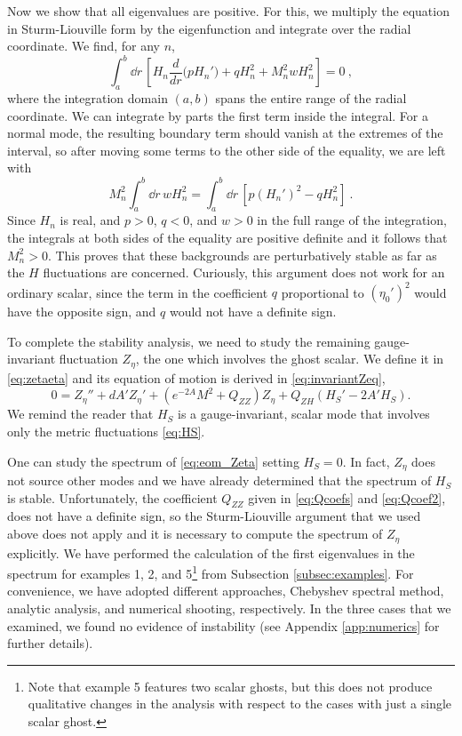 Now we show that all eigenvalues are positive. For this, we multiply the equation in Sturm-Liouville form by the eigenfunction and integrate over the radial coordinate. We find, for any $n$,
\begin{equation}
	\int_a^b  \dd r \, \left[H_n\frac{d}{dr}\Big(p H_n'\Big)+q H_n^2+M_n^2 w H_n^2\right]=0\ ,
\end{equation}
where the integration domain $(a,b)$ spans the entire range of the radial coordinate. We can integrate by parts the first term inside the integral. For a normal mode, the resulting boundary term should vanish at the extremes of the interval, so after moving some terms to the other side of the equality, we are left with
\begin{equation}
	M_n^2\int_a^b  \dd r \, w H_n^2=\int_a^b  \dd r \, \left[p (H_n')^2-q H_n^2\right]\ .
\end{equation}
Since $H_n$ is real, and $p>0$, $q<0$, and $w>0$ in the full range of the integration, the integrals at both sides of the equality are positive definite and it follows that $M_n^2>0$.
This proves that these backgrounds are perturbatively stable as far as the $H$ fluctuations are concerned. Curiously, this argument does not work for an ordinary scalar, since the term in the coefficient $q$ proportional to $(\eta_0')^2$ would have the opposite sign, and $q$ would not have a definite sign.

To complete the stability analysis, we need to study the remaining gauge-invariant fluctuation $Z_\eta$, the one which involves the ghost scalar. We define it in \eqref{eq:zetaeta} and its equation of motion is derived in \eqref{eq:invariantZeq},
\begin{equation}
	\label{eq:eom_Zeta}
	0=Z_\eta''+dA' Z_\eta'+\left(e^{-2A}M^2+Q_{ZZ}\right)Z_\eta+Q_{ZH}(H_S'-2A' H_S).
\end{equation}
We remind the reader that $H_S$ is a gauge-invariant, scalar mode that involves only the metric fluctuations \eqref{eq:HS}. 

One can study the spectrum of \eqref{eq:eom_Zeta} setting $H_S=0$. In fact, $Z_\eta$ does not source other modes and we have already determined that the spectrum of $H_S$ is stable. Unfortunately, the coefficient $Q_{ZZ}$ given in \eqref{eq:Qcoefs} and \eqref{eq:Qcoef2}, does not have a definite sign, so the Sturm-Liouville argument that we used above does not apply and it is necessary to compute the spectrum of $Z_\eta$ explicitly. We have performed the calculation of the first eigenvalues in the spectrum for examples 1, 2, and 5\footnote{Note that example 5 features two scalar ghosts, but this does not produce qualitative changes in the analysis with respect to the cases with just a single scalar ghost.} from Subsection \ref{subsec:examples}. For convenience, we have adopted different approaches, Chebyshev spectral method, analytic analysis, and numerical shooting, respectively. In the three cases that we examined, we found no evidence of instability (see Appendix \ref{app:numerics} for further details).

